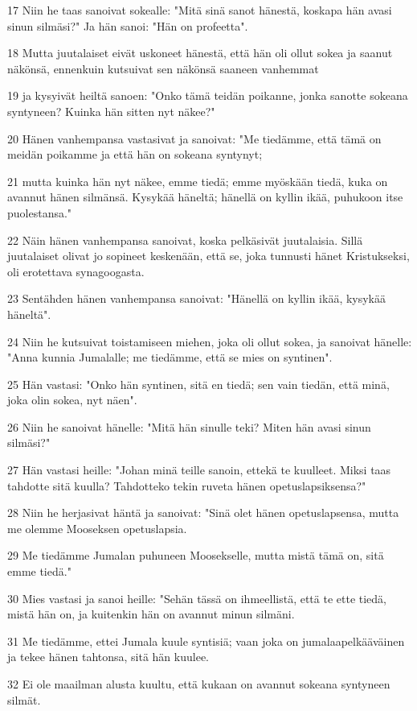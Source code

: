 \par 17 Niin he taas sanoivat sokealle: "Mitä sinä sanot hänestä, koskapa hän avasi sinun silmäsi?" Ja hän sanoi: "Hän on profeetta".
\par 18 Mutta juutalaiset eivät uskoneet hänestä, että hän oli ollut sokea ja saanut näkönsä, ennenkuin kutsuivat sen näkönsä saaneen vanhemmat
\par 19 ja kysyivät heiltä sanoen: "Onko tämä teidän poikanne, jonka sanotte sokeana syntyneen? Kuinka hän sitten nyt näkee?"
\par 20 Hänen vanhempansa vastasivat ja sanoivat: "Me tiedämme, että tämä on meidän poikamme ja että hän on sokeana syntynyt;
\par 21 mutta kuinka hän nyt näkee, emme tiedä; emme myöskään tiedä, kuka on avannut hänen silmänsä. Kysykää häneltä; hänellä on kyllin ikää, puhukoon itse puolestansa."
\par 22 Näin hänen vanhempansa sanoivat, koska pelkäsivät juutalaisia. Sillä juutalaiset olivat jo sopineet keskenään, että se, joka tunnusti hänet Kristukseksi, oli erotettava synagoogasta.
\par 23 Sentähden hänen vanhempansa sanoivat: "Hänellä on kyllin ikää, kysykää häneltä".
\par 24 Niin he kutsuivat toistamiseen miehen, joka oli ollut sokea, ja sanoivat hänelle: "Anna kunnia Jumalalle; me tiedämme, että se mies on syntinen".
\par 25 Hän vastasi: "Onko hän syntinen, sitä en tiedä; sen vain tiedän, että minä, joka olin sokea, nyt näen".
\par 26 Niin he sanoivat hänelle: "Mitä hän sinulle teki? Miten hän avasi sinun silmäsi?"
\par 27 Hän vastasi heille: "Johan minä teille sanoin, ettekä te kuulleet. Miksi taas tahdotte sitä kuulla? Tahdotteko tekin ruveta hänen opetuslapsiksensa?"
\par 28 Niin he herjasivat häntä ja sanoivat: "Sinä olet hänen opetuslapsensa, mutta me olemme Mooseksen opetuslapsia.
\par 29 Me tiedämme Jumalan puhuneen Moosekselle, mutta mistä tämä on, sitä emme tiedä."
\par 30 Mies vastasi ja sanoi heille: "Sehän tässä on ihmeellistä, että te ette tiedä, mistä hän on, ja kuitenkin hän on avannut minun silmäni.
\par 31 Me tiedämme, ettei Jumala kuule syntisiä; vaan joka on jumalaapelkääväinen ja tekee hänen tahtonsa, sitä hän kuulee.
\par 32 Ei ole maailman alusta kuultu, että kukaan on avannut sokeana syntyneen silmät.
